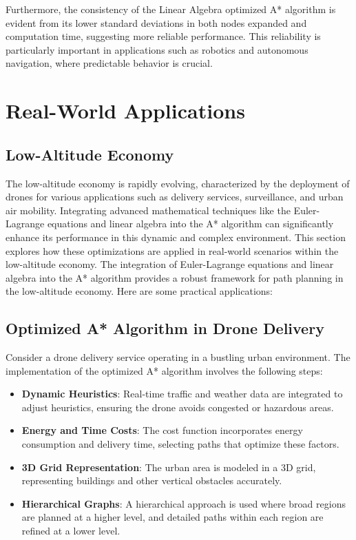 \documentclass[12pt]{article}
\begin{document}
Furthermore, the consistency of the Linear Algebra optimized A* algorithm is evident from its lower standard deviations in both nodes expanded and computation time, suggesting more reliable performance. This reliability is particularly important in applications such as robotics and autonomous navigation, where predictable behavior is crucial. 
\newpage
\section{Real-World Applications}
\subsection{Low-Altitude Economy}
The low-altitude economy is rapidly evolving, characterized by the deployment of drones for various applications such as delivery services, surveillance, and urban air mobility. Integrating advanced mathematical techniques like the Euler-Lagrange equations and linear algebra into the A* algorithm can significantly enhance its performance in this dynamic and complex environment. This section explores how these optimizations are applied in real-world scenarios within the low-altitude economy. The integration of Euler-Lagrange equations and linear algebra into the A* algorithm provides a robust framework for path planning in the low-altitude economy. Here are some practical applications:

\subsection{Optimized A* Algorithm in Drone Delivery}

Consider a drone delivery service operating in a bustling urban environment. The implementation of the optimized A* algorithm involves the following steps:


\begin{itemize}
    \item \textbf{Dynamic Heuristics}: Real-time traffic and weather data are integrated to adjust heuristics, ensuring the drone avoids congested or hazardous areas.
    \item \textbf{Energy and Time Costs}: The cost function incorporates energy consumption and delivery time, selecting paths that optimize these factors.
\end{itemize}


\begin{itemize}
    \item \textbf{3D Grid Representation}: The urban area is modeled in a 3D grid, representing buildings and other vertical obstacles accurately.
    \item \textbf{Hierarchical Graphs}: A hierarchical approach is used where broad regions are planned at a higher level, and detailed paths within each region are refined at a lower level.
\end{itemize}
\end{document}
